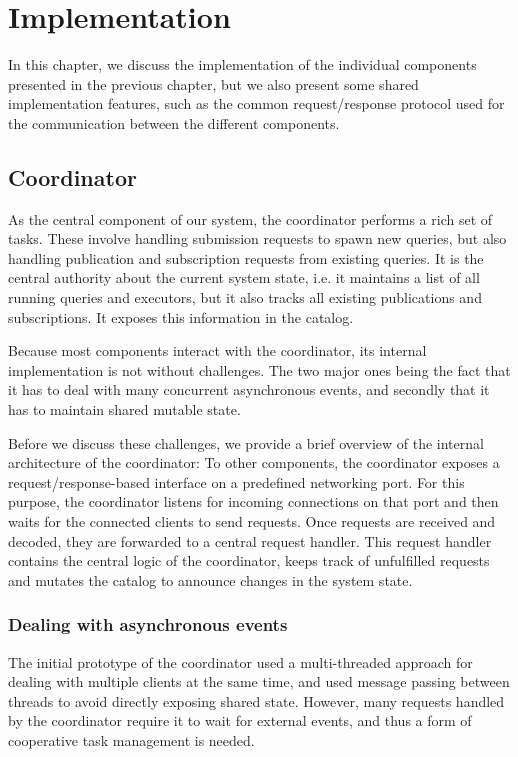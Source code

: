 \chapter{Implementation}\label{ch:impl}

In this chapter, we discuss the implementation of the individual components
presented in the previous chapter, but we also present some shared implementation
features, such as the common request/response protocol used for the
communication between the different components.

\section{Coordinator}

As the central component of our system, the coordinator performs a rich
set of tasks. These involve handling submission requests to spawn new queries,
but also handling publication and subscription requests from existing queries.
It is the central authority about the current system state, i.e. it maintains
a list of all running queries and executors, but it also tracks all existing
publications and subscriptions. It exposes this information in the catalog.

Because most components interact with the coordinator, its
internal implementation is not without challenges. The two major ones
being the fact that it has to deal with many concurrent asynchronous events,
and secondly that it has to maintain shared mutable state.

Before we discuss these challenges, we provide a brief overview of the
internal architecture of the coordinator: To other components, the coordinator
exposes a request/response-based interface on a predefined networking port.
For this purpose, the coordinator listens for incoming connections on that port
and then waits for the connected clients to send requests. Once requests are
received and decoded, they are forwarded to a central request handler. This
request handler contains the central logic of the coordinator, keeps track of
unfulfilled requests and mutates the catalog to announce changes in the
system state.

\subsection{Dealing with asynchronous events}
The initial prototype of the coordinator used a multi-threaded approach for dealing
with multiple clients at the same time, and used message passing between threads
to avoid directly exposing shared state. However, many requests handled by
the coordinator require it to wait for external events, and thus a form of
cooperative task management is needed.

